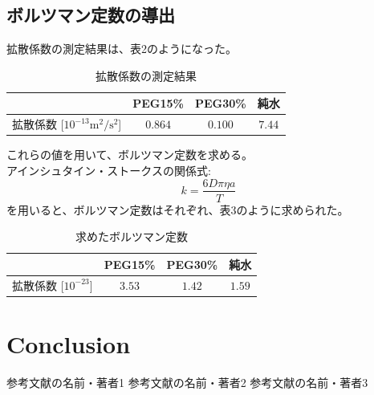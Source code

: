 \documentclass[a4paper,10pt]{jsarticle}
\begin{document}
    \subsection*{ボルツマン定数の導出}
    拡散係数の測定結果は、表2のようになった。\\
    \begin{center}
      \begin{table}[ht]
      \caption{拡散係数の測定結果}
      \centering
      \begin{tabular}{cccc}
        \hline
         & PEG15\% & PEG30\% & 純水 \\
        \hline
        拡散係数 [$10^{-13} \text{m}^2/\text{s}^2$] & $0.864$ & $0.100$ & $7.44$ \\
        \hline
      \end{tabular}
      \end{table}
      \end{center}
      これらの値を用いて、ボルツマン定数を求める。\\
      アインシュタイン・ストークスの関係式:
    \begin{equation}
      k = \frac{6D\pi\eta a}{T}
      \end{equation}
      を用いると、ボルツマン定数はそれぞれ、表3のように求められた。\\
      \begin{center}
        \begin{table}[ht]
        \caption{求めたボルツマン定数}
        \centering
        \begin{tabular}{cccc}
          \hline
           & PEG15\% & PEG30\% & 純水 \\
          \hline
          拡散係数 [$10^{-23}$] & $3.53$ & $1.42$ & $1.59$ \\
          \hline
        \end{tabular}
        \end{table}
        \end{center}
\section{\textrm{Conclusion}}


\begin{thebibliography}{文献数}
 参考文献の名前・著者1
 参考文献の名前・著者2
 参考文献の名前・著者3
\end{thebibliography}
\end{document}
